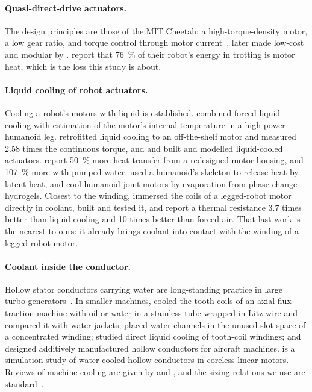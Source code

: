 \documentclass[11pt]{article}
\begin{document}
\paragraph{Quasi-direct-drive actuators.} The design principles are those of
the MIT Cheetah: a high-torque-density motor, a low gear ratio, and torque
control through motor current~\cite{seok2015,wensing2017}, later made low-cost
and modular by \citet{katz2018}. \citet{seok2015} report that
\SI{76}{\percent} of their robot's energy in trotting is motor heat, which is
the loss this study is about.

\paragraph{Liquid cooling of robot actuators.} Cooling a robot's motors with
liquid is established. \citet{urata2010} combined forced liquid cooling with estimation of the
motor's internal temperature in a high-power humanoid leg.
\citet{paine2015} retrofitted liquid cooling to an off-the-shelf motor and
measured 2.58 times the continuous torque, and \citet{kim2018} and
\citet{zhu2019} built and modelled liquid-cooled actuators. \citet{mazumdar2016} report \SI{50}{\percent} more heat transfer from a
redesigned motor housing, and \SI{107}{\percent} more with pumped water.
\citet{kozuki2016} used a humanoid's skeleton to release heat by latent heat,
and \citet{li2026} cool humanoid joint motors by evaporation from
phase-change hydrogels. Closest to the winding, \citet{zhu2021} immersed the
coils of a legged-robot motor directly in coolant, built and tested it, and
report a thermal resistance 3.7 times better than liquid cooling and 10 times
better than forced air. That last work is the nearest to ours: it
already brings coolant into contact with the winding of a legged-robot motor.

\paragraph{Coolant inside the conductor.} Hollow stator conductors carrying
water are long-standing practice in large turbo-generators~\cite{bauer2021,
svoboda2004}. In smaller machines, \citet{lindh2016,lindh2017} cooled the
tooth coils of an axial-flux traction machine with oil or water in a stainless
tube wrapped in Litz wire and compared it with water jackets;
\citet{schiefer2015} placed water channels in the unused slot space of a
concentrated winding; \citet{wohlers2018} studied direct liquid cooling of
tooth-coil windings; and \citet{wu2020,wu2021} designed additively manufactured hollow
conductors for aircraft machines. \citet{geelen2024} is a simulation study of
water-cooled hollow conductors in coreless linear motors. Reviews of
machine cooling are given by \citet{gai2019} and \citet{yang2017}, and the
sizing relations we use are standard~\cite{pyrhonen2013}.
\end{document}
